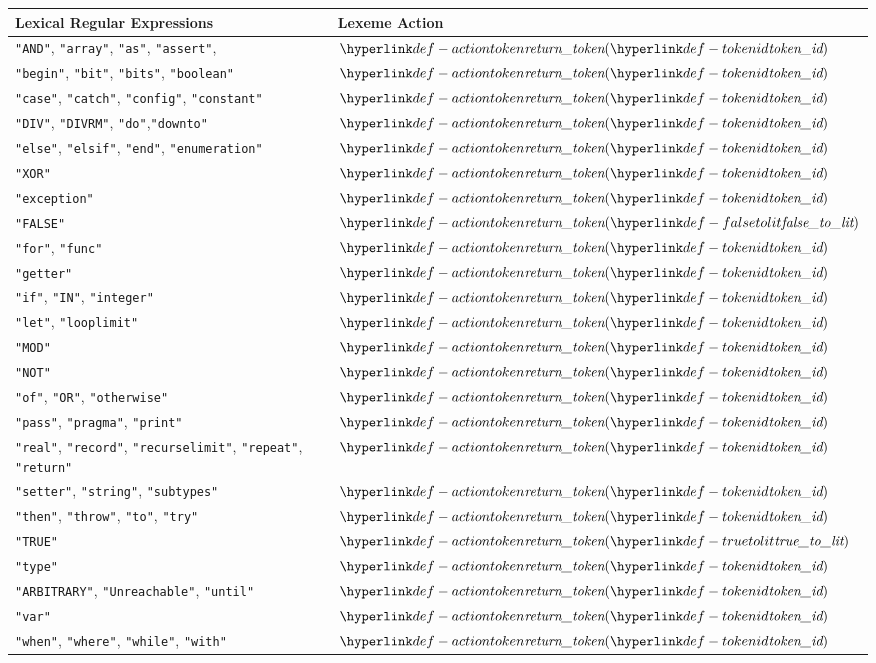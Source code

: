 \begin{center}
\begin{tabular}{ll}
\textbf{Lexical Regular Expressions} & \textbf{Lexeme Action}\\
\hline
\texttt{"AND"}, \texttt{"array"}, \texttt{"as"}, \texttt{"assert"},      & $\actiontoken(\tokenid)$ \\
\texttt{"begin"}, \texttt{"bit"}, \texttt{"bits"}, \texttt{"boolean"}       & $\actiontoken(\tokenid)$ \\
\texttt{"case"}, \texttt{"catch"}, \texttt{"config"}, \texttt{"constant"}      & $\actiontoken(\tokenid)$ \\
\texttt{"DIV"}, \texttt{"DIVRM"}, \texttt{"do"},\texttt{"downto"}        & $\actiontoken(\tokenid)$ \\
\texttt{"else"}, \texttt{"elsif"}, \texttt{"end"}, \texttt{"enumeration"}   & $\actiontoken(\tokenid)$ \\
\texttt{"XOR"}           & $\actiontoken(\tokenid)$ \\
\texttt{"exception"}     & $\actiontoken(\tokenid)$ \\
\texttt{"FALSE"} & $\actiontoken(\falsetolit)$  \\
\texttt{"for"}, \texttt{"func"}          & $\actiontoken(\tokenid)$ \\
\texttt{"getter"}        & $\actiontoken(\tokenid)$ \\
\texttt{"if"}, \texttt{"IN"}, \texttt{"integer"}       & $\actiontoken(\tokenid)$ \\
\texttt{"let"}, \texttt{"looplimit"}           & $\actiontoken(\tokenid)$ \\
\texttt{"MOD"}           & $\actiontoken(\tokenid)$ \\
\texttt{"NOT"}           & $\actiontoken(\tokenid)$ \\
\texttt{"of"},      \texttt{"OR"},      \texttt{"otherwise"}                  & $\actiontoken(\tokenid)$ \\
\texttt{"pass"},    \texttt{"pragma"},  \texttt{"print"}                      & $\actiontoken(\tokenid)$ \\
\texttt{"real"},    \texttt{"record"},  \texttt{"recurselimit"}, \texttt{"repeat"}, \texttt{"return"}  & $\actiontoken(\tokenid)$ \\
\texttt{"setter"},  \texttt{"string"},  \texttt{"subtypes"}                   & $\actiontoken(\tokenid)$ \\
\texttt{"then"},    \texttt{"throw"},   \texttt{"to"}, \texttt{"try"}         & $\actiontoken(\tokenid)$ \\
\texttt{"TRUE"}          & $\actiontoken(\truetolit)$ \\
\texttt{"type"}          & $\actiontoken(\tokenid)$ \\
\texttt{"ARBITRARY"}, \texttt{"Unreachable"}, \texttt{"until"}         & $\actiontoken(\tokenid)$ \\
\texttt{"var"}           & $\actiontoken(\tokenid)$ \\
\texttt{"when"}, \texttt{"where"}, \texttt{"while"}, \texttt{"with"}          & $\actiontoken(\tokenid)$ \\
\hline
\end{tabular}
\end{center}


